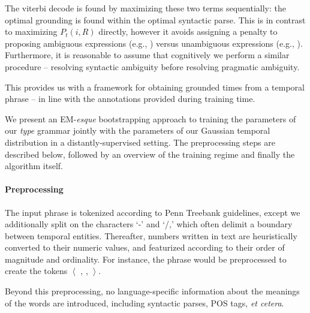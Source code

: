 The viterbi decode is found by maximizing these two terms sequentially:
	the optimal grounding is found within the optimal syntactic parse.
This is in contrast to maximizing $P_t(i,R)$ directly, however it avoids
	assigning a penalty to proposing ambiguous expressions (e.g., )
	versus unambiguous expressions (e.g., ).
Furthermore, it is reasonable to assume that cognitively we perform a
	similar procedure -- resolving syntactic ambiguity before resolving
	pragmatic ambiguity.

This provides us with a framework for obtaining grounded times from a
	temporal phrase -- in line with the annotations provided during training
	time.


We present an EM-\textit{esque} bootstrapping approach to training the 
	parameters of our \textit{type} grammar jointly with the parameters of our 
	Gaussian temporal distribution in a distantly-supervised setting.
The preprocessing steps are described below, followed by an overview
	of the training regime and finally the algorithm itself.

\paragraph{Preprocessing}
The input phrase is tokenized according to Penn Treebank guidelines,
	except we additionally split on the characters `-' and `/,' which
	often delimit a boundary between temporal entities.
Thereafter, numbers written in text are heuristically converted to their
	numeric values, and featurized according to their order of magnitude
	and ordinality.
For instance, the phrase  would be preprocessed to create the
	tokens $\left<\right.$  , \tp{-} ,  
		$\left.\right>$.

Beyond this preprocessing, no language-specific information about the meanings
	of the words are introduced, including syntactic parses, POS tags,
	\textit{et cetera}.


